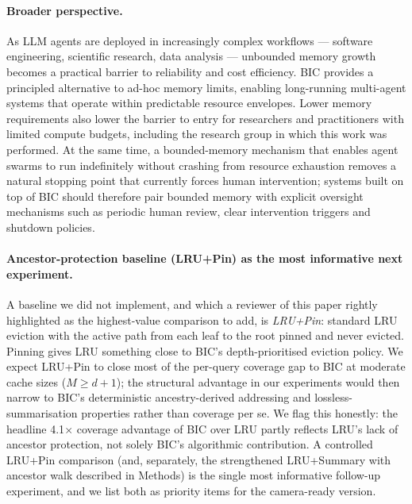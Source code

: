 \documentclass[fleqn,10pt]{article}
\theoremstyle{definition}
\newcommand{\slots}{M}
\begin{document}
\paragraph{Broader perspective.}
As LLM agents are deployed in increasingly complex workflows ---
software engineering, scientific research, data analysis --- unbounded
memory growth becomes a practical barrier to reliability and cost
efficiency. BIC provides a principled alternative to ad-hoc memory
limits, enabling long-running multi-agent systems that operate within
predictable resource envelopes. Lower memory requirements also lower
the barrier to entry for researchers and practitioners with limited
compute budgets, including the research group in which this work was
performed. At the same time, a bounded-memory mechanism that enables
agent swarms to run indefinitely without crashing from resource
exhaustion removes a natural stopping point that currently forces
human intervention; systems built on top of BIC should therefore pair
bounded memory with explicit oversight mechanisms such as periodic
human review, clear intervention triggers and shutdown policies.

\paragraph{Ancestor-protection baseline (LRU+Pin) as the most informative next experiment.}
A baseline we did not implement, and which a reviewer of this
paper rightly highlighted as the highest-value comparison to add, is
\emph{LRU+Pin}: standard LRU eviction with the active path from
each leaf to the root pinned and never evicted. Pinning gives LRU
something close to BIC's depth-prioritised eviction policy. We
expect LRU+Pin to close most of the per-query coverage gap to BIC at
moderate cache sizes ($\slots \geq d{+}1$); the structural advantage
in our experiments would then narrow to BIC's deterministic
ancestry-derived addressing and lossless-summarisation properties
rather than coverage per se. We flag this honestly: the headline
4.1$\times$ coverage advantage of BIC over LRU partly reflects LRU's
lack of ancestor protection, not solely BIC's algorithmic
contribution. A controlled LRU+Pin comparison (and, separately, the
strengthened LRU+Summary with ancestor walk described in Methods) is
the single most informative follow-up experiment, and we list both
as priority items for the camera-ready version.

\end{document}
